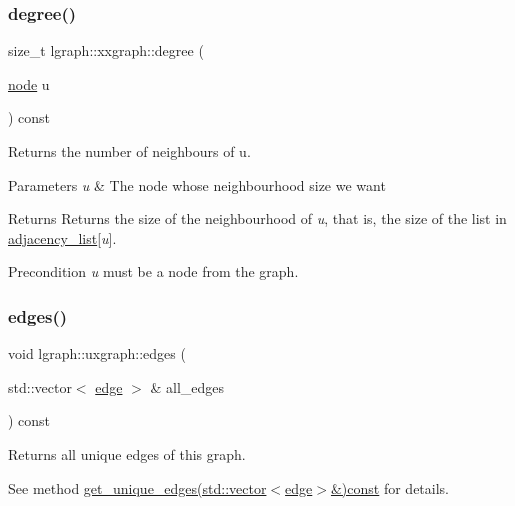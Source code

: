\subsubsection{\texorpdfstring{degree()}{degree()}}
{\footnotesize\ttfamily size\+\_\+t lgraph\+::xxgraph\+::degree (\begin{DoxyParamCaption}\item[{\hyperlink{namespacelgraph_a397169dd66adf725210a30fb7251773e}{node}}]{u }\end{DoxyParamCaption}) const\hspace{0.3cm}{\ttfamily [inherited]}}



Returns the number of neighbours of u. 


\begin{DoxyParams}{Parameters}
{\em u} & The node whose neighbourhood size we want \\
\hline
\end{DoxyParams}
\begin{DoxyReturn}{Returns}
Returns the size of the neighbourhood of {\itshape u}, that is, the size of the list in \hyperlink{classlgraph_1_1xxgraph_a31cf82d0b20be05290be259dc97a51ec}{adjacency\+\_\+list}\mbox{[}{\itshape u}\mbox{]}. 
\end{DoxyReturn}
\begin{DoxyPrecond}{Precondition}
{\itshape u} must be a node from the graph. 
\end{DoxyPrecond}
\mbox{\label{classlgraph_1_1uxgraph_abf4c5ce2b595780e6ba80f06bdd0be16}} 
\subsubsection{\texorpdfstring{edges()}{edges()}}
{\footnotesize\ttfamily void lgraph\+::uxgraph\+::edges (\begin{DoxyParamCaption}\item[{std\+::vector$<$ \hyperlink{namespacelgraph_a76bd7d50719f03de7a85db259d80d572}{edge} $>$ \&}]{all\+\_\+edges }\end{DoxyParamCaption}) const\hspace{0.3cm}{\ttfamily [inherited]}}



Returns all unique edges of this graph. 

See method \hyperlink{classlgraph_1_1udgraph_a91ee7ee8d37197f9441a93f1e19a1f29}{get\+\_\+unique\+\_\+edges(std\+::vector$<$edge$>$\&)const} for details. \mbox{\label{classlgraph_1_1xxgraph_a5f48a91046766e3e0b71a3326f2b9153}} 
